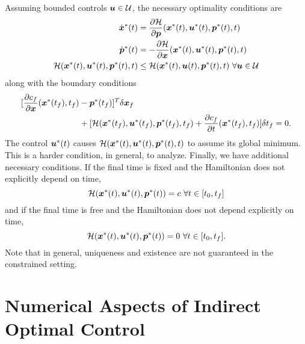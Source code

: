 Assuming bounded controls $\bm{u} \in \mathcal{U}$, the necessary optimality conditions are 
\begin{align}
    \label{eq:nec_pmp_conds1}
    \dot{\bm{x}}^*(t) &= \frac{\partial \mathcal{H}}{\partial \bm{p}}(\bm{x}^*(t),\bm{u}^*(t),\bm{p}^*(t),t)\\
    \dot{\bm{p}}^*(t) &= -\frac{\partial \mathcal{H}}{\partial \bm{x}}(\bm{x}^*(t),\bm{u}^*(t),\bm{p}^*(t),t)\\
    \mathcal{H}(\bm{x}^*(t),\bm{u}^*(t), \bm{p}^*(t), t) &\leq \mathcal{H}(\bm{x}^*(t),\bm{u}(t), \bm{p}^*(t), t) \,\,\forall \bm{u} \in \mathcal{U}
    \label{eq:nec_pmp_conds3}
\end{align}
along with the boundary conditions
\begin{align}
\label{eq:ham_bcs}
    [\frac{\partial c_f}{\partial \bm{x}}(\bm{x}^*(t_f),t_f)& - \bm{p}^*(t_f)]^T \delta \bm{x}_f\\
    & + [ \mathcal{H}(\bm{x}^*(t_f),\bm{u}^*(t_f), \bm{p}^*(t_f), t_f) + \frac{\partial c_f}{\partial t}(\bm{x}^*(t_f),t_f)] \delta t_f = 0. \nonumber
\end{align}
The control $\bm{u}^*(t)$ causes $\mathcal{H}(\bm{x}^*(t),\bm{u}^*(t),\bm{p}^*(t),t)$ to assume its global minimum. This is a harder condition, in general, to analyze. Finally, we have additional necessary conditions. If the final time is fixed and the Hamiltonian does not explicitly depend on time, 
\begin{equation}
    \mathcal{H}(\bm{x}^*(t),\bm{u}^*(t),\bm{p}^*(t)) = c \,\, \forall t \in [t_0,t_f]
\end{equation}
and if the final time is free and the Hamiltonian does not depend explicitly on time, 
\begin{equation}
    \mathcal{H}(\bm{x}^*(t),\bm{u}^*(t),\bm{p}^*(t)) = 0 \,\, \forall t \in [t_0,t_f].
\end{equation}
Note that in general, uniqueness and existence are not guaranteed in the constrained setting. 


\section{Numerical Aspects of Indirect Optimal Control}


